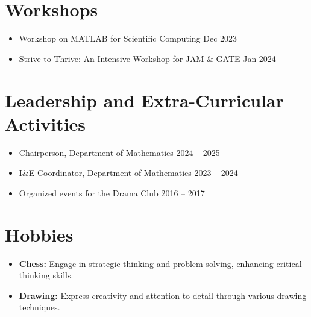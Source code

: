 \documentclass[a4paper,10pt]{article}
\begin{document}
\section*{Workshops}
\begin{itemize}[leftmargin=1.5cm]
    \item Workshop on MATLAB for Scientific Computing \hfill Dec 2023
    \item Strive to Thrive: An Intensive Workshop for JAM \& GATE \hfill Jan 2024
\end{itemize}

\section*{Leadership and Extra-Curricular Activities}
\begin{itemize}[leftmargin=1.5cm]
    \item Chairperson, Department of Mathematics \hfill 2024 -- 2025
    \item I\&E Coordinator, Department of Mathematics \hfill 2023 -- 2024
    \item Organized events for the Drama Club \hfill 2016 -- 2017
\end{itemize}

\section*{Hobbies}
\begin{itemize}[leftmargin=1.5cm]
    \item \textbf{Chess:} Engage in strategic thinking and problem-solving, enhancing critical thinking skills.
    \item \textbf{Drawing:} Express creativity and attention to detail through various drawing techniques.
\end{itemize}
\end{document}
